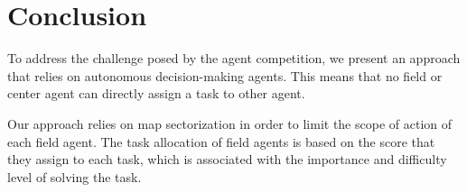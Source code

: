 \section{Conclusion}

To address the challenge posed by the agent competition, we present an approach that relies on autonomous decision-making agents. This means that no field or center agent can directly assign a task to other agent. %

Our approach relies on map sectorization in order to limit the scope of action of each field agent. The task allocation of field agents is based on the score that they assign to each task, which is associated with the importance and difficulty level of solving the task. %


